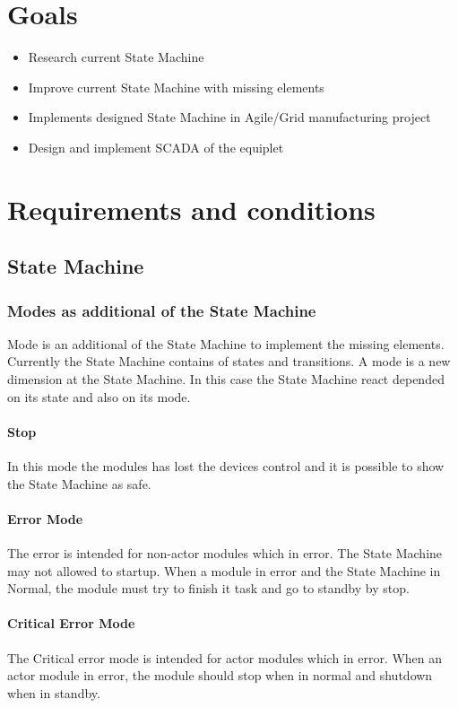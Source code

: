 \documentclass[12pt,a4paper]{report}
\begin{document}
\section{Goals}
\begin{itemize}
\item Research current State Machine
\item Improve current State Machine with missing elements
\item Implements designed State Machine in Agile/Grid manufacturing project 
\item Design and implement SCADA of the equiplet
\end{itemize}

\newpage
\section{Requirements and conditions}

\subsection{State Machine}
\subsubsection{Modes as additional of the State Machine}
Mode is an additional of the State Machine to implement the missing elements.
Currently the State Machine contains of states and transitions. A mode is a new dimension at the State Machine. In this case the State Machine react depended on its state and also on its mode.
\paragraph{Stop}In this mode the modules has lost the devices control and it is possible to show the State Machine as safe.
\paragraph{Error Mode}The error is intended for non-actor modules which in error. The State Machine may not allowed to startup. When a module in error and the State Machine in Normal, the module must try to finish it task and go to standby by stop.
\paragraph{Critical Error Mode}The Critical error mode is intended for actor modules which in error. When an actor module in error, the module should stop when in normal and shutdown when in standby.
\end{document}
